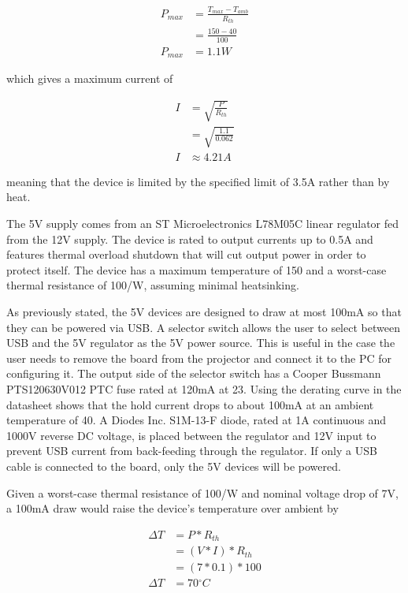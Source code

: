 \documentclass{article}
\newcommand{\degree}{\ensuremath{^{\circ}}}
\begin{document}
\begin{align*}
    P_{max} &= \frac{T_{max}-T_{amb}}{R_{th}} \\
    &= \frac{150 - 40}{100} \\
    P_{max} &= 1.1W
\end{align*}

which gives a maximum current of

\begin{align*}
    I &= \sqrt{\frac{P}{R_{th}}} \\
    &= \sqrt{\frac{1.1}{0.062}} \\
    I &\approx 4.21A
\end{align*}

meaning that the device is limited by the specified limit of 3.5A rather than by heat.

The 5V supply comes from an ST Microelectronics L78M05C linear regulator fed from the 12V supply.
The device is rated to output currents up to 0.5A and features thermal overload shutdown that will
cut output power in order to protect itself.  The device has a maximum temperature of
150\textcelsius{} and a worst-case thermal resistance of 100\textcelsius{}/W, assuming minimal
heatsinking.

As previously stated, the 5V devices are designed to draw at most 100mA so that they can be powered
via USB.  A selector switch allows the user to select between USB and the 5V regulator as the 5V
power source.  This is useful in the case the user needs to remove the board from the projector and
connect it to the PC for configuring it.  The output side of the selector switch has a Cooper
Bussmann PTS120630V012 PTC fuse rated at 120mA at 23\textcelsius{}.  Using the derating curve in the
datasheet shows that the hold current drops to about 100mA at an ambient temperature of
40\textcelsius{}.  A Diodes Inc. S1M-13-F diode, rated at 1A continuous and 1000V reverse DC voltage,
is placed between the regulator and 12V input to prevent USB current from back-feeding through the
regulator.  If only a USB cable is connected to the board, only the 5V devices will be powered.

Given a worst-case thermal resistance of 100\textcelsius{}/W and nominal voltage drop of 7V, a 100mA
draw would raise the device's temperature over ambient by

\begin{align*}
    \Delta T &= P * R_{th} \\
    &= (V*I) * R_{th} \\
    &= (7 * 0.1) * 100 \\
    \Delta T &= 70\degree C
\end{align*}
\end{document}
